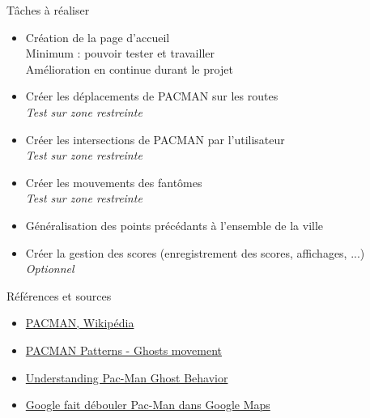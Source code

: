 \documentclass{beamer}
\newcommand{\optionnel}{{\color{orange} \textit{Optionnel}}}
\newcommand{\test}{{\color{blue} \textit{Test sur zone restreinte}}}
\begin{document}
\begin{frame}{Tâches à réaliser}
    \begin{itemize}[label=$\rhd$]
        \item Création de la page d'accueil \\
              {\scriptsize Minimum : pouvoir tester et travailler \\
              Amélioration en continue durant le projet}
        \item Créer les déplacements de PACMAN sur les routes \\
              \test
        \item Créer les intersections de PACMAN par l'utilisateur \\
              \test
        \item Créer les mouvements des fantômes \\
              \test
        \item Généralisation des points précédants à l'ensemble de la ville \\
        \item Créer la gestion des scores (enregistrement des scores, affichages, ...) \\
              \optionnel
    \end{itemize}
\end{frame}

\begin{frame}{Références et sources}
    \begin{itemize}[label=$\rhd$]
        \item \href{https://fr.wikipedia.org/wiki/Pac-Man}{PACMAN, Wikipédia}
        \item \href{https://dev.to/code2bits/pac-man-patterns--ghost-movement-strategy-pattern-1k1a}{PACMAN Patterns - Ghosts movement}
        \item \href{https://gameinternals.com/understanding-pac-man-ghost-behavior}{Understanding Pac-Man Ghost Behavior}
        \item \href{https://www.lefigaro.fr/secteur/high-tech/2015/03/31/32001-20150331ARTFIG00349-google-fait-debouler-pac-man-dans-google-maps.php}{Google fait débouler Pac-Man dans Google Maps}
    \end{itemize}
\end{frame}
\end{document}
